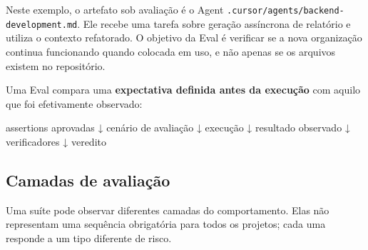 \documentclass[
  10pt,
  a4paper,
  oneside]{book}
\newenvironment{Shaded}{}{}
\newcommand{\NormalTok}[1]{#1}
\renewenvironment{Shaded}{\begin{snugshade}}{\end{snugshade}}%
\begin{document}
Neste exemplo, o artefato sob avaliação é o Agent
\texttt{.cursor/agents/backend-development.md}. Ele recebe uma tarefa
sobre geração assíncrona de relatório e utiliza o contexto refatorado. O
objetivo da Eval é verificar se a nova organização continua funcionando
quando colocada em uso, e não apenas se os arquivos existem no
repositório.

Uma Eval compara uma \textbf{expectativa definida antes da execução} com
aquilo que foi efetivamente observado:

\begin{Shaded}
\begin{Highlighting}[]
\NormalTok{assertions aprovadas}
\NormalTok{        ↓}
\NormalTok{cenário de avaliação}
\NormalTok{        ↓}
\NormalTok{execução}
\NormalTok{        ↓}
\NormalTok{resultado observado}
\NormalTok{        ↓}
\NormalTok{verificadores}
\NormalTok{        ↓}
\NormalTok{veredito}
\end{Highlighting}
\end{Shaded}

\hypertarget{camadas-de-avaliauxe7uxe3o}{%
\subsection{Camadas de avaliação}\label{camadas-de-avaliauxe7uxe3o}}

Uma suíte pode observar diferentes camadas do comportamento. Elas não
representam uma sequência obrigatória para todos os projetos; cada uma
responde a um tipo diferente de risco.
\end{document}
